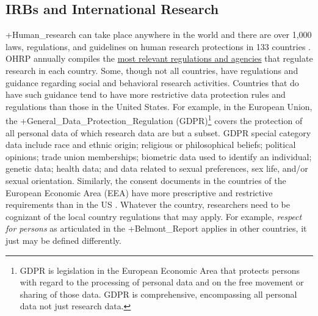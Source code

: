 \documentclass[
]{WileySix}
\begin{document}
\hypertarget{irbs-and-international-research}{%
\subsection{IRBs and International Research}\label{irbs-and-international-research}}

+Human\_research\textbar{} can take place anywhere in the world and there are over 1,000 laws, regulations, and guidelines on human research protections in 133 countries \citep{officeforhumanresearchprotections2020}. OHRP annually compiles the \href{https://www.hhs.gov/ohrp/sites/default/files/2020-international-compilation-of-human-research-standards.pdf}{most relevant regulations and agencies} that regulate research in each country. Some, though not all countries, have regulations and guidance regarding social and behavioral research activities. Countries that do have such guidance tend to have more restrictive data protection rules and regulations than those in the United States. For example, in the European Union, the +General\_Data\_Protection\_Regulation\textbar{} (GDPR)\footnote{GDPR is legislation in the European Economic Area that protects persons with regard to the processing of personal data and on the free movement or sharing of those data. GDPR is comprehensive, encompassing all personal data not just research data.} \citep{europeanparliamentandcounciloftheeuropeanunion2016} covers the protection of all personal data of which research data are but a subset. GDPR special category data include race and ethnic origin; religious or philosophical beliefs; political opinions; trade union memberships; biometric data used to identify an individual; genetic data; health data; and data related to sexual preferences, sex life, and/or sexual orientation. Similarly, the consent documents in the countries of the European Economic Area (EEA) have more prescriptive and restrictive requirements than in the US \citep{officeforhumanresearchprotections2018}. Whatever the country, researchers need to be cognizant of the local country regulations that may apply. For example, \emph{respect for persons} as articulated in the +Belmont\_Report\textbar{} applies in other countries, it just may be defined differently.
\end{document}
